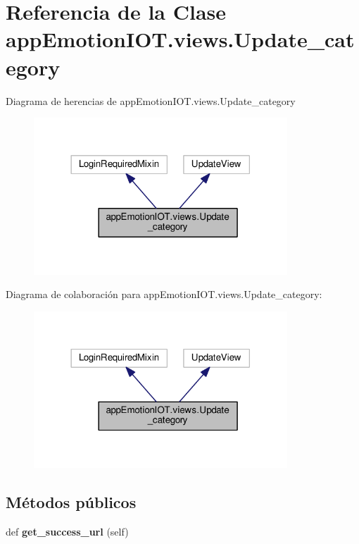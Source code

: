 \hypertarget{classappEmotionIOT_1_1views_1_1Update__category}{}\section{Referencia de la Clase app\+Emotion\+I\+O\+T.\+views.\+Update\+\_\+category}
\label{classappEmotionIOT_1_1views_1_1Update__category}


Diagrama de herencias de app\+Emotion\+I\+O\+T.\+views.\+Update\+\_\+category
\nopagebreak
\begin{figure}[H]
\begin{center}
\leavevmode
\includegraphics[width=270pt]{classappEmotionIOT_1_1views_1_1Update__category__inherit__graph}
\end{center}
\end{figure}


Diagrama de colaboración para app\+Emotion\+I\+O\+T.\+views.\+Update\+\_\+category\+:
\nopagebreak
\begin{figure}[H]
\begin{center}
\leavevmode
\includegraphics[width=270pt]{classappEmotionIOT_1_1views_1_1Update__category__coll__graph}
\end{center}
\end{figure}
\subsection*{Métodos públicos}
\begin{DoxyCompactItemize}
\item 
def {\bfseries get\+\_\+success\+\_\+url} (self)\hypertarget{classappEmotionIOT_1_1views_1_1Update__category_af8422e4852c3e727d3d3be62dab1c6c0}{}\label{classappEmotionIOT_1_1views_1_1Update__category_af8422e4852c3e727d3d3be62dab1c6c0}

\end{DoxyCompactItemize}
